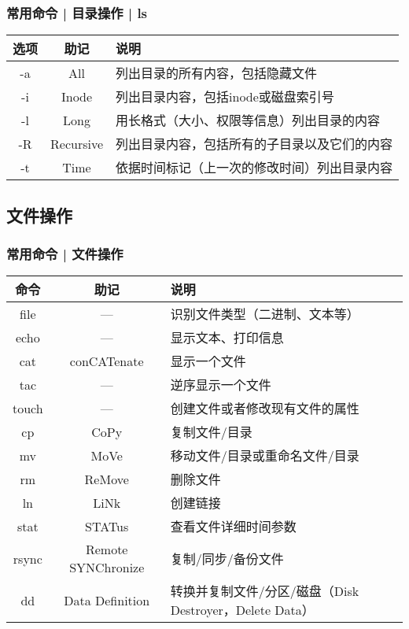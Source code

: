 \begin{frame}
  \frametitle{常用命令 | 目录操作 | \alert{ls}}
  \begin{table}
    \centering
    \begin{tabular}{ccl}
      \hline
      \rowcolor{blue!50}选项 & 助记 & 说明\\
      \hline
      -a & All & 列出目录的所有内容，包括隐藏文件\\
      -i & Inode & 列出目录内容，包括inode或磁盘索引号\\
      -l & Long & 用长格式（大小、权限等信息）列出目录的内容\\
      -R & Recursive & 列出目录内容，包括所有的子目录以及它们的内容\\
      -t & Time & 依据时间标记（上一次的修改时间）列出目录内容\\
      \hline
    \end{tabular}
  \end{table}
\end{frame}

\subsection{文件操作}
\begin{frame}
  \frametitle{常用命令 | \alert{文件操作}}
  \begin{table}
    \centering
    \begin{tabularx}{\textwidth}{ccX}
      \hline
      \rowcolor{blue!50}命令 & 助记 & 说明\\
      \hline
      file & --- & 识别文件类型（二进制、文本等）\\
      echo & --- &  显示文本、打印信息\\
      cat & conCATenate & 显示一个文件\\
      tac & --- & 逆序显示一个文件\\
      touch & --- & 创建文件或者修改现有文件的属性\\
      cp & CoPy & 复制文件/目录\\
      mv & MoVe & 移动文件/目录或重命名文件/目录\\
      rm & ReMove & 删除文件\\
      ln & LiNk & 创建链接\\
      stat & STATus & 查看文件详细时间参数\\
      \hline
      rsync & Remote SYNChronize & 复制/同步/备份文件\\
      dd & Data Definition & 转换并复制文件/分区/磁盘（Disk Destroyer，Delete Data）\\
      \hline
    \end{tabularx}
  \end{table}
\end{frame}

